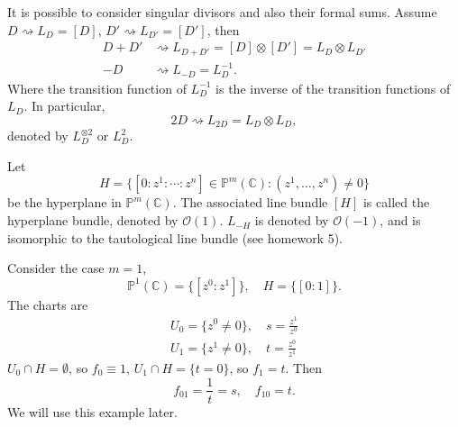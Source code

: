 \documentclass[12pt]{article}
\begin{document}
\begin{remark}
  It is possible to consider singular divisors and also their formal sums.
  Assume \(D\rightsquigarrow L_D=[D]\), \(D'\rightsquigarrow L_{D'}=[D']\), then
  \begin{align*}
    D+D'&\rightsquigarrow L_{D+D'}=[D]\otimes [D']=L_D\otimes L_{D'} \\
    -D&\rightsquigarrow L_{-D}=L_D^{-1}
  .\end{align*}
  Where the transition function of \(L_D^{-1}\) is the inverse of the transition
  functions of \(L_D\). In particular, \[
    2D\rightsquigarrow L_{2D}=L_D\otimes L_D
  ,\] denoted by \(L_D^{\otimes 2}\) or \(L_D^2\).
\end{remark}
\begin{example}
  Let \[
    H=\{[0:z^1:\cdots :z^n]\in \mathbb{P}^m(\mathbb{C}):(z^1,\ldots,z^n)\neq 0\}
  \] be the hyperplane in \(\mathbb{P}^m(\mathbb{C})\). The associated line bundle
  \([H]\) is called the hyperplane bundle, denoted by \(\mathcal{O}(1)\).
  \(L_{-H}\) is denoted by \(\mathcal{O}(-1)\), and is isomorphic to the tautological
  line bundle (see homework 5).
\end{example}
\begin{example}
  Consider the case \(m=1\), \[
    \mathbb{P}^1(\mathbb{C})=\{[z^0:z^1]\},\quad H=\{[0:1]\}
  .\] The charts are
  \begin{gather*}
    U_0=\{z^0\neq 0\},\quad s=\frac{z^1}{z^0} \\
    U_1=\{z^1\neq 0\},\quad t=\frac{z^0}{z^1}
  \end{gather*}
  \(U_0\cap H=\emptyset\), so \(f_0\equiv 1\), \(U_1\cap H=\{t=0\}\), so \(f_1=t\).
  Then \[
    f_{01}=\frac{1}{t}=s,\quad f_{10}=t.
  \] We will use this example later.
\end{example}
\end{document}
